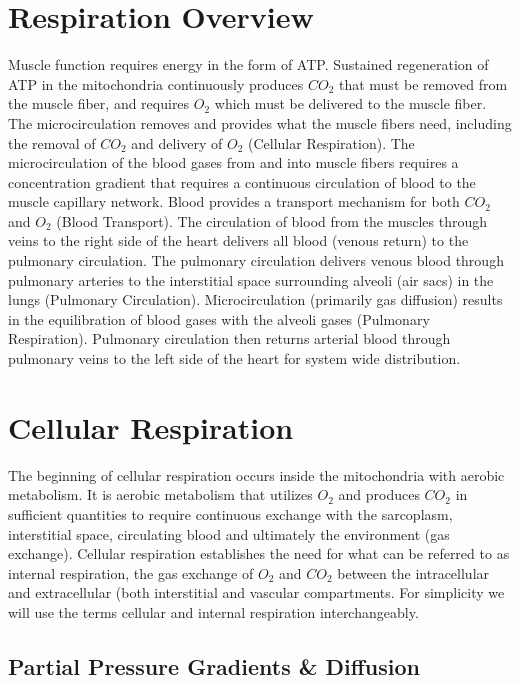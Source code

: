 \section{Respiration Overview}
Muscle function requires energy in the form of ATP. Sustained regeneration of ATP in the mitochondria continuously produces $CO_2$ that must be removed from the muscle fiber, and requires $O_2$ which must be delivered to the muscle fiber. The microcirculation removes and provides what the muscle fibers need, including the removal of $CO_2$ and delivery of $O_2$ (Cellular Respiration). The microcirculation of the blood gases from and into muscle fibers requires a concentration gradient that requires a continuous circulation of blood to the muscle capillary network. Blood provides a transport mechanism for both $CO_2$ and $O_2$ (Blood Transport). The circulation of blood from the muscles through veins to the right side of the heart delivers all blood (venous return) to the pulmonary circulation. The pulmonary circulation delivers venous blood through pulmonary arteries to the interstitial space surrounding alveoli (air sacs) in the lungs (Pulmonary Circulation). Microcirculation (primarily gas diffusion) results in the equilibration of blood gases with the alveoli gases (Pulmonary Respiration). Pulmonary circulation then returns arterial blood through pulmonary veins to the left side of the heart for system wide distribution.

\section{Cellular Respiration}

The beginning of cellular respiration occurs inside the mitochondria with aerobic metabolism. It is aerobic metabolism that utilizes $O_2$ and produces $CO_2$ in sufficient quantities to require continuous exchange with the sarcoplasm, interstitial space, circulating blood and ultimately the environment (gas exchange). Cellular respiration establishes the need for what can be referred to as internal respiration, the gas exchange of $O_2$ and $CO_2$ between the intracellular and extracellular (both interstitial and vascular compartments. For simplicity we will use the terms cellular and internal respiration interchangeably.

\subsection{Partial Pressure Gradients \& Diffusion}

